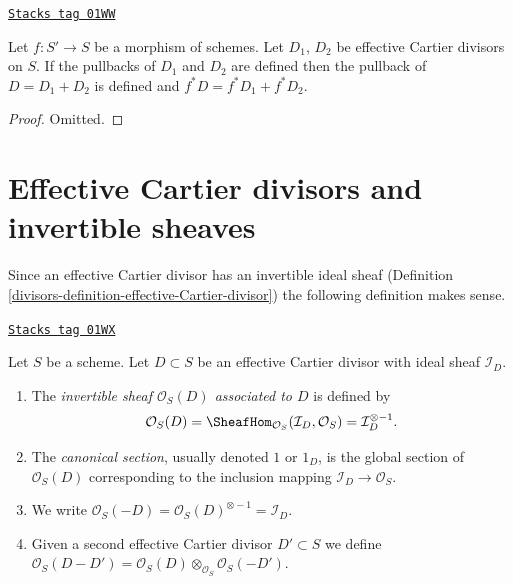 \begin{lemma}
\label{divisors-lemma-pullback-effective-Cartier-divisors-additive}
\href{https://stacks.math.columbia.edu/tag/01WW}{\texttt{Stacks tag 01WW}}

Let $f : S' \to S$ be a morphism of schemes.
Let $D_1$, $D_2$ be effective Cartier divisors on $S$.
If the pullbacks of $D_1$ and $D_2$ are defined then the
pullback of $D = D_1 + D_2$ is defined and
$f^*D = f^*D_1 + f^*D_2$.
\end{lemma}

\begin{proof}
Omitted.
\end{proof}

\section{Effective Cartier divisors and invertible sheaves}
\label{divisors-section-effective-Cartier-invertible}
Since an effective Cartier divisor has an invertible ideal sheaf
(Definition \ref{divisors-definition-effective-Cartier-divisor}) the
following definition makes sense.

\begin{definition}
\label{divisors-definition-invertible-sheaf-effective-Cartier-divisor}
\href{https://stacks.math.columbia.edu/tag/01WX}{\texttt{Stacks tag 01WX}}

Let $S$ be a scheme. Let $D \subset S$ be an effective Cartier divisor
with ideal sheaf $\mathcal{I}_D$.
\begin{enumerate}
\item The {\it invertible sheaf $\mathcal{O}_S(D)$ associated to $D$}
is defined by
$$
\mathcal{O}_S(D) =
\SheafHom_{\mathcal{O}_S}(\mathcal{I}_D, \mathcal{O}_S) =
\mathcal{I}_D^{\otimes -1}.
$$
\item The {\it canonical section}, usually denoted $1$ or $1_D$, is the
global section of $\mathcal{O}_S(D)$ corresponding to
the inclusion mapping $\mathcal{I}_D \to \mathcal{O}_S$.
\item We write
$\mathcal{O}_S(-D) = \mathcal{O}_S(D)^{\otimes -1} = \mathcal{I}_D$.
\item Given a second effective Cartier divisor $D' \subset S$ we define
$\mathcal{O}_S(D - D') =
\mathcal{O}_S(D) \otimes_{\mathcal{O}_S} \mathcal{O}_S(-D')$.
\end{enumerate}
\end{definition}

